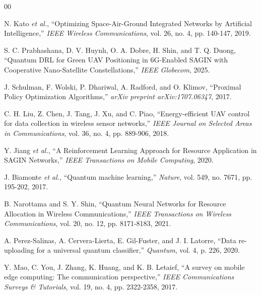 \documentclass[conference]{IEEEtran}
\begin{document}
\begin{thebibliography}{00}

 N. Kato \textit{et al.}, ``Optimizing Space-Air-Ground Integrated Networks by Artificial Intelligence,'' \textit{IEEE Wireless Communications}, vol. 26, no. 4, pp. 140-147, 2019.

 S. C. Prabhashana, D. V. Huynh, O. A. Dobre, H. Shin, and T. Q. Duong, ``Quantum DRL for Green UAV Positioning in 6G-Enabled SAGIN with Cooperative Nano-Satellite Constellations,'' \textit{IEEE Globecom}, 2025.

 J. Schulman, F. Wolski, P. Dhariwal, A. Radford, and O. Klimov, ``Proximal Policy Optimization Algorithms,'' \textit{arXiv preprint arXiv:1707.06347}, 2017.

 C. H. Liu, Z. Chen, J. Tang, J. Xu, and C. Piao, ``Energy-efficient UAV control for data collection in wireless sensor networks,'' \textit{IEEE Journal on Selected Areas in Communications}, vol. 36, no. 4, pp. 889-906, 2018.

 Y. Jiang \textit{et al.}, ``A Reinforcement Learning Approach for Resource Application in SAGIN Networks,'' \textit{IEEE Transactions on Mobile Computing}, 2020. 

 J. Biamonte \textit{et al.}, ``Quantum machine learning,'' \textit{Nature}, vol. 549, no. 7671, pp. 195-202, 2017.

 B. Narottama and S. Y. Shin, ``Quantum Neural Networks for Resource Allocation in Wireless Communications,'' \textit{IEEE Transactions on Wireless Communications}, vol. 20, no. 12, pp. 8171-8183, 2021.

 A. Perez-Salinas, A. Cervera-Lierta, E. Gil-Fuster, and J. I. Latorre, ``Data re-uploading for a universal quantum classifier,'' \textit{Quantum}, vol. 4, p. 226, 2020.

 Y. Mao, C. You, J. Zhang, K. Huang, and K. B. Letaief, ``A survey on mobile edge computing: The communication perspective,'' \textit{IEEE Communications Surveys \& Tutorials}, vol. 19, no. 4, pp. 2322-2358, 2017.

\end{thebibliography}
\end{document}
